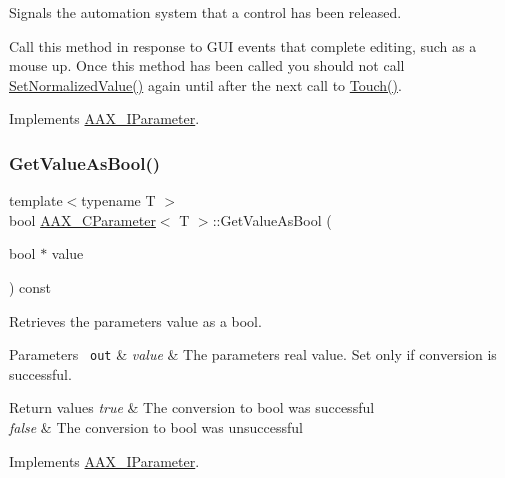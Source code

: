 Signals the automation system that a control has been released. 

Call this method in response to G\+UI events that complete editing, such as a mouse up. Once this method has been called you should not call \mbox{\hyperlink{a01537_ac4f8ae8c5ecb2cd04ebc3aa2523449f7}{Set\+Normalized\+Value()}} again until after the next call to \mbox{\hyperlink{a01537_afb023dec89c366c2f5667c2a225b1df9}{Touch()}}. 

Implements \mbox{\hyperlink{a01857_a3d4869d9b6ec03d4f95f33f56479756f}{A\+A\+X\+\_\+\+I\+Parameter}}.

\mbox{\label{a01537_a70d1b697d4a449b57de917baa0b50e95}} 
\subsubsection{\texorpdfstring{GetValueAsBool()}{GetValueAsBool()}}
{\footnotesize\ttfamily template$<$typename T $>$ \\
bool \mbox{\hyperlink{a01537}{A\+A\+X\+\_\+\+C\+Parameter}}$<$ T $>$\+::Get\+Value\+As\+Bool (\begin{DoxyParamCaption}\item[{bool $\ast$}]{value }\end{DoxyParamCaption}) const\hspace{0.3cm}{\ttfamily [virtual]}}



Retrieves the parameter\textquotesingle{}s value as a bool. 


\begin{DoxyParams}[1]{Parameters}
\mbox{\texttt{ out}}  & {\em value} & The parameter\textquotesingle{}s real value. Set only if conversion is successful.\\
\hline
\end{DoxyParams}

\begin{DoxyRetVals}{Return values}
{\em true} & The conversion to bool was successful \\
\hline
{\em false} & The conversion to bool was unsuccessful \\
\hline
\end{DoxyRetVals}


Implements \mbox{\hyperlink{a01857_a9d86d7e89489e7f7ccbacaa55eb98f72}{A\+A\+X\+\_\+\+I\+Parameter}}.


